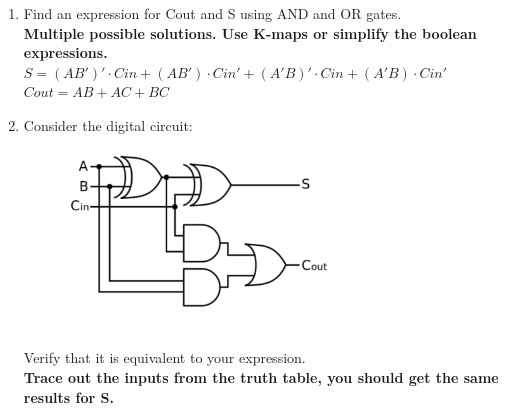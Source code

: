 \documentclass{article}
\begin{document}
\begin{enumerate}[label=\alph*.]
    \item Find an expression for Cout and S using AND and OR gates.\\
    \textbf{Multiple possible solutions. Use K-maps or simplify the boolean expressions.}\\
    $S = (AB')' \cdot Cin + (AB') \cdot Cin' + (A'B)' \cdot Cin + (A'B) \cdot Cin'$ \\
    $Cout = AB + AC + BC$
    
    \item Consider the digital circuit: 
    \begin{figure}[!h]
        \centering
        \includegraphics[width=0.7\textwidth]{figures/adder1b.png}
    \end{figure}
    \\ Verify that it is equivalent to your expression. \\
    \textbf{Trace out the inputs from the truth table, you should get the same results for S.}
\end{enumerate}
\end{document}
